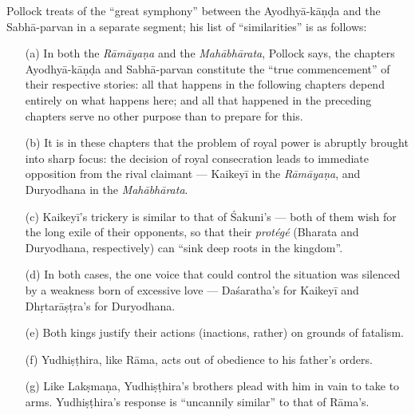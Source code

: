 Pollock treats of the “great symphony” between the Ayodhyā-kāṇḍa and the Sabhā-parvan in a separate segment; his list of “similarities” is as follows: 
\begin{itemize}
\item[(a)] In both the {\sl Rāmāyaṇa} and the {\sl Mahābhārata}, Pollock says, the chapters Ayodhyā-kāṇḍa and Sabhā-parvan constitute the “true commencement” of their respective stories: all that happens in the following chapters depend entirely on what happens here; and all that happened in the preceding chapters serve no other purpose than to prepare for this.

\item[(b)] It is in these chapters that the problem of royal power is abruptly brought into sharp focus: the decision of royal consecration leads to immediate opposition from the rival claimant --- Kaikeyī in the {\sl Rāmāyaṇa}, and Duryodhana in the {\sl Mahābhārata}. 

\item[(c)] Kaikeyī’s trickery is similar to that of Śakuni’s --- both of them wish for the long exile of their opponents, so that their {\sl protégé} (Bharata and Duryodhana, respectively) can “sink deep roots in the kingdom”. 
\newpage

\item[(d)] In both cases, the one voice that could control the situation was silenced by a weakness born of excessive love --- Daśaratha’s for Kaikeyī and Dhṛtarāṣṭra’s for Duryodhana.  

\item[(e)] Both kings justify their actions (inactions, rather) on grounds of fatalism.

\item[(f)] Yudhiṣṭhira, like Rāma, acts out of obedience to his father’s orders. 

\item[(g)] Like Lakṣmaṇa, Yudhiṣṭhira’s brothers plead with him in vain to take to arms. Yudhiṣṭhira’s response is “uncannily similar” to that of Rāma’s.  
\end{itemize}

